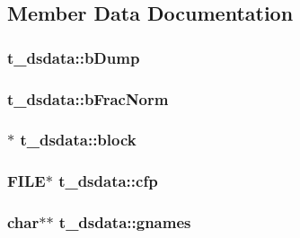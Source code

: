 \subsection{\-Member \-Data \-Documentation}
\hypertarget{structt__dsdata_add04f207599c288bcea27eb151d885bd}{
\subsubsection[{b\-Dump}]{ {\bf t\-\_\-dsdata\-::b\-Dump}}}\label{structt__dsdata_add04f207599c288bcea27eb151d885bd}
\hypertarget{structt__dsdata_ad8400dfd91bac4fae30492e9b1a06284}{
\subsubsection[{b\-Frac\-Norm}]{ {\bf t\-\_\-dsdata\-::b\-Frac\-Norm}}}\label{structt__dsdata_ad8400dfd91bac4fae30492e9b1a06284}
\hypertarget{structt__dsdata_a2952ae20c5addc05683a1add7cb0661e}{
\subsubsection[{block}]{$\ast$ {\bf t\-\_\-dsdata\-::block}}}\label{structt__dsdata_a2952ae20c5addc05683a1add7cb0661e}
\hypertarget{structt__dsdata_ad71462680cde1d2043c83d872c077d7d}{
\subsubsection[{cfp}]{\setlength{\rightskip}{0pt plus 5cm}\-F\-I\-L\-E$\ast$ {\bf t\-\_\-dsdata\-::cfp}}}\label{structt__dsdata_ad71462680cde1d2043c83d872c077d7d}
\hypertarget{structt__dsdata_a3c008052983521c857c1c1cc1d46ed41}{
\subsubsection[{gnames}]{\setlength{\rightskip}{0pt plus 5cm}char$\ast$$\ast$ {\bf t\-\_\-dsdata\-::gnames}}}\label{structt__dsdata_a3c008052983521c857c1c1cc1d46ed41}
